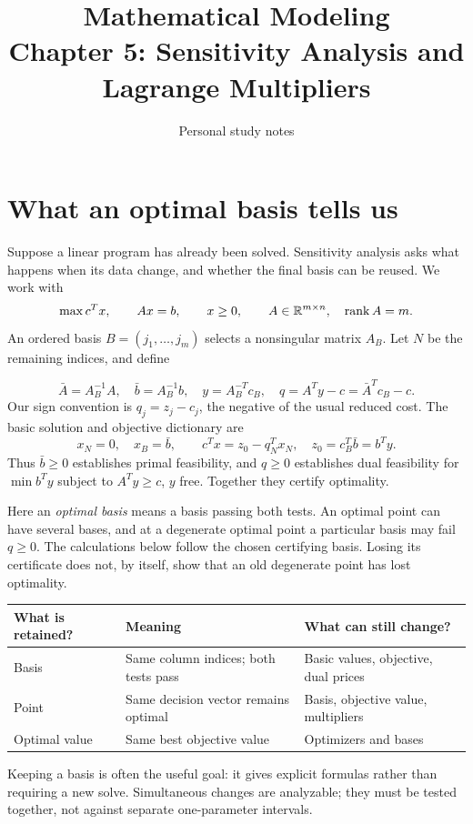 \documentclass[11pt,a4paper]{article}
\title{\textbf{Mathematical Modeling}\\[2mm]
\large Chapter 5: Sensitivity Analysis and Lagrange Multipliers}
\author{Personal study notes}
\date{}
\begin{document}
\maketitle
\lecturelegend
{\small\tableofcontents}
\clearpage

\section{What an optimal basis tells us}\label{sec:basis}
Suppose a linear program has already been solved. Sensitivity analysis asks what
happens when its data change, and whether the final basis can be reused.
We work with
\[
  \max c^Tx,\qquad Ax=b,\qquad x\geq0,\qquad
  A\in\mathbb{R}^{m\times n},\quad\operatorname{rank}A=m.
\]
An ordered basis $B=(j_1,\ldots,j_m)$ selects a nonsingular matrix $A_B$.
Let $N$ be the remaining indices, and define
\begin{lecturecore}
  \begin{equation}\label{eq:basis-data}
    \bar A=A_B^{-1}A,\quad\bar b=A_B^{-1}b,\quad
    y=A_B^{-T}c_B,\quad q=A^Ty-c=\bar A^Tc_B-c.
  \end{equation}
  Our sign convention is $q_j=z_j-c_j$, the negative of the usual reduced cost.
  The basic solution and objective dictionary are
  \begin{equation}\label{eq:dictionary}
    x_N=0,\quad x_B=\bar b,\qquad
    c^Tx=z_0-q_N^Tx_N,\quad z_0=c_B^T\bar b=b^Ty.
  \end{equation}
  Thus $\bar b\geq0$ establishes primal feasibility, and $q\geq0$ establishes
  dual feasibility for $\min b^Ty$ subject to $A^Ty\geq c$, $y$ free.
  Together they certify optimality.

\end{lecturecore}
Here an \emph{optimal basis} means a basis passing both tests. An optimal point
can have several bases, and at a degenerate optimal point a particular basis may
fail $q\geq0$. The calculations below follow the chosen certifying basis.
Losing its certificate does not, by itself, show that an old degenerate point
has lost optimality.

\begin{center}
  \begin{tabular}{>{\raggedright\arraybackslash}p{2.5cm}>{\raggedright\arraybackslash}p{5.1cm}>{\raggedright\arraybackslash}p{5.5cm}}
    \toprule
    What is retained? & Meaning & What can still change?\\\midrule
    Basis & Same column indices; both tests pass & Basic values, objective, dual prices\\
    Point & Same decision vector remains optimal & Basis, objective value, multipliers\\
    Optimal value & Same best objective value & Optimizers and bases\\\bottomrule
  \end{tabular}
\end{center}
Keeping a basis is often the useful goal: it gives explicit formulas rather
than requiring a new solve. Simultaneous changes are analyzable;
they must be tested together, not against separate one-parameter intervals.
\end{document}
